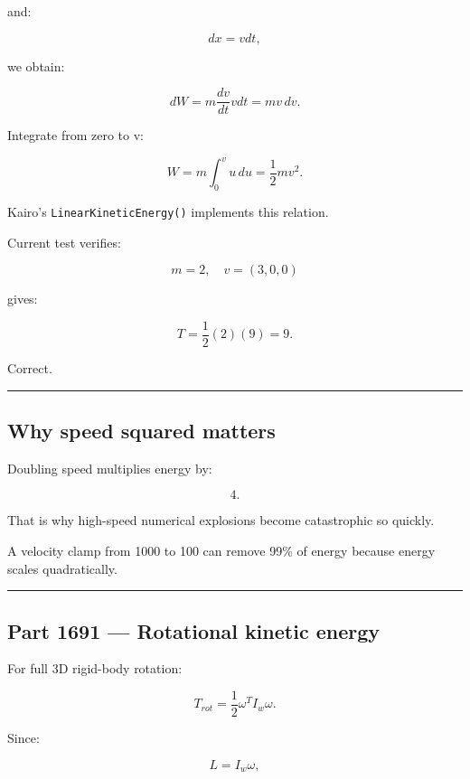 and:

\[
dx=vdt,
\]

we obtain:

\[
dW
=
m\frac{dv}{dt}vdt
=
mv\,dv.
\]

Integrate from zero to v:

\[
W
=
m\int_0^v u\,du
=
\frac12mv^2.
\]

Kairo's \texttt{LinearKineticEnergy()} implements this relation.

Current test verifies:

\[
m=2,
\quad
v=(3,0,0)
\]

gives:

\[
T=
\frac12(2)(9)=9.
\]

Correct.

\begin{center}\rule{0.5\linewidth}{0.5pt}\end{center}

\subsection{Why speed squared matters}\label{06-engine-ii-ch039-why-speed-squared-matters}

\hypertarget{06-engine-ii-ch039-why-speed-squared-matters}{}

Doubling speed multiplies energy by:

\[
4.
\]

That is why high-speed numerical explosions become catastrophic so quickly.

A velocity clamp from 1000 to 100 can remove 99\% of energy because energy scales quadratically.

\begin{center}\rule{0.5\linewidth}{0.5pt}\end{center}

\subsection{Part 1691 --- Rotational kinetic energy}\label{06-engine-ii-ch039-part-1691-rotational-kinetic-energy}

\hypertarget{06-engine-ii-ch039-part-1691-rotational-kinetic-energy}{}

For full 3D rigid-body rotation:

\[
\boxed{
T_{rot}
=
\frac12
\omega^T
I_w
\omega.
}
\]

Since:

\[
L=I_w\omega,
\]

